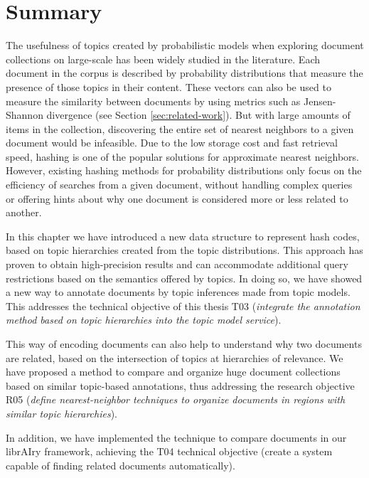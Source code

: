 \section{Summary}

The usefulness of topics created by probabilistic models when exploring document collections on large-scale has been widely studied in the literature. Each document in the corpus is described by probability distributions that measure the presence of those topics in their content. These vectors can also be used to measure the similarity between documents by using metrics such as Jensen-Shannon divergence (see Section \ref{sec:related-work}). But with large amounts of items in the collection, discovering the entire set of nearest neighbors to a given document would be infeasible. Due to the low storage cost and fast retrieval speed, hashing is one of the popular solutions for approximate nearest neighbors. However, existing hashing methods for probability distributions only focus on the efficiency of searches from a given document, without handling complex queries or offering hints about why one document is considered more or less related to another. 


In this chapter we have introduced a new data structure to represent hash codes, based on topic  hierarchies created from the topic distributions. This approach has proven to obtain high-precision results and can accommodate additional query restrictions based on the semantics offered by topics. In doing so, we have showed a new way to annotate documents by topic inferences made from topic models. This addresses the technical objective of this thesis T03 (\textit{integrate the annotation method based on topic hierarchies into the topic model service}).

This way of encoding documents can also help to understand why two documents are related, based on the intersection of topics at hierarchies of relevance. We have proposed a method to compare and organize huge document collections based on similar topic-based annotations, thus addressing the research objective R05 (\textit{define nearest-neighbor techniques to organize documents in regions with similar topic hierarchies}).

In addition, we have implemented the technique to compare documents in our librAIry framework, achieving the T04 technical objective (create a system capable of finding related documents automatically).